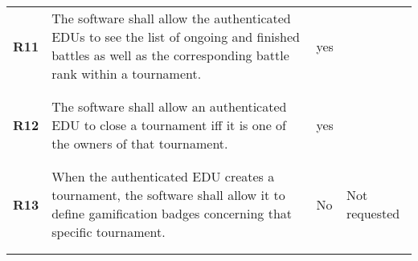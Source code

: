 \begin{longtable}[H]{l p{6.5cm} l p{3cm}}
    \textbf{R11} & The software shall allow the authenticated EDUs to see the list of ongoing and finished battles as well as the corresponding battle rank within a tournament.                                                                                                            & {\color{green}yes}   &                                                                                         \\
                 &                                                                                                                                                                                                                                                                          &                      &                                                                                         \\\hline & & & \\
    \textbf{R12} & The software shall allow an authenticated EDU to close a tournament iff it is one of the owners of that tournament.                                                                                                                                                      & {\color{green}yes}   &                                                                                         \\
                 &                                                                                                                                                                                                                                                                          &                      &                                                                                         \\\hline & & & \\
    \textbf{R13} & When the authenticated EDU creates a tournament, the software shall allow it to define gamification badges concerning that specific tournament.                                                                                                                          & No                   & Not requested                                                                           \\
                 &                                                                                                                                                                                                                                                                          &                      &                                                                                         \\\hline & & & \\

\end{longtable}
